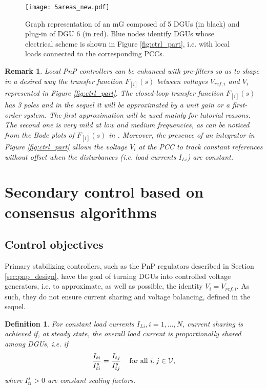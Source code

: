 \documentclass[a4paper]{article}
\theoremstyle{plain}
\newtheorem{rmk}{Remark}
\newtheorem{definition}{Definition}
\begin{document}
\begin{figure}
	\centering
	\texttt{[image: 5areas\_new.pdf]}
	\caption{Graph representation of an mG composed of 5 DGUs (in black)
		and plug-in of DGU 6 (in red). Blue nodes identify DGUs whose electrical scheme is shown in Figure \ref{fig:ctrl_part}, i.e. with local loads connected to the corresponding PCCs.}
	\label{fig:5areasplug}
\end{figure}

\begin{rmk}
	\label{rmk:integral}
	Local PnP controllers can be enhanced with pre-filters so as to shape
	in a desired way the transfer function $F_{[i]}(s)$ between voltages
	$V_{ref,i}$ and $V_i$ represented in Figure
	\ref{fig:ctrl_part}. The closed-loop transfer function $F_{[i]}(s)$
	has 3 poles and in the sequel it will be approximated by a unit gain
	or a first-order system. The first approximation will be used mainly
	for tutorial reasons. The second one is very mild at low and medium
	frequencies, as can be noticed from the Bode plots of
	$F_{[i]}(s)$ in
	\cite{tucci2015decentralized}. Moreover, the presence of an
	integrator in Figure \ref{fig:ctrl_part} allows the
	voltage $V_i$ at the PCC to
	track constant references without offset when the
	disturbances (i.e. load currents $I_{Li}$) are constant.
\end{rmk}

\section{Secondary control based on consensus algorithms}
\label{sec:consensus}
\subsection{Control objectives}
Primary stabilizing  controllers, such as the PnP regulators described in Section \ref{sec:pnp_design}, have the goal of turning DGUs into controlled voltage generators, i.e. to approximate, as well as possible, the identity $V_i = V_{ref,i}$. As such, they do not ensure current sharing and voltage balancing, defined in the sequel.
\begin{definition}
	\label{defn:cs}
	For constant load currents $I_{Li},i=1,\dots,N$, \textit{current sharing} is achieved if, at steady state, the overall load current is
	proportionally shared among DGUs, i.e. if
	\begin{equation}
	\label{eq:cs_defn}
	\frac{I_{ti}}{I_{ti}^s} = \frac{I_{tj}}{I_{tj}^s}\hspace{4mm}\text{for all }i,j\in \mathcal{V},
	\end{equation}
	where $I_{ti}^s>0$ are constant scaling factors.
\end{definition}
\end{document}

